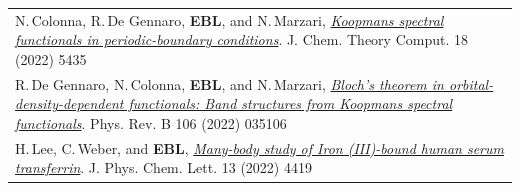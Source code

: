 \documentclass[10pt,a4paper,final]{article}
\begin{document}
\begin{tabularx}{\textwidth}{
   X}
   \footnotesize N.\,Colonna, R.\,De Gennaro, \textbf{EBL}, and N.\,Marzari, \href{https://pubs.acs.org/doi/10.1021/acs.jctc.2c00161}{\textit{Koopmans spectral functionals in periodic-boundary conditions}}. J. Chem. Theory Comput. 18 (2022) 5435                                                                                                                                                                                                                                                                                                                                                                                                                                                                                                                                                                \\ %
   \footnotesize R.\,De Gennaro, N.\,Colonna, \textbf{EBL}, and N.\,Marzari, \href{https://doi.org/10.1103/PhysRevB.106.035106}{\textit{Bloch's theorem in orbital-density-dependent functionals: Band structures from Koopmans spectral functionals}}. Phys. Rev. B 106 (2022) 035106                                                                                                                                                                                                                                                                                                                                                                                                                                                                                                     \\ %
   \footnotesize H.\,Lee, C.\,Weber, and \textbf{EBL}, \href{https://doi.org/10.1021/acs.jpclett.2c00680}{\textit{Many-body study of Iron (III)-bound human serum transferrin}}. J. Phys. Chem. Lett. 13 (2022) 4419                                                                                                                                                                                                                                                                                                                                                                                                                                                                                                                                                                      \\ %

\end{tabularx}
\end{document}
